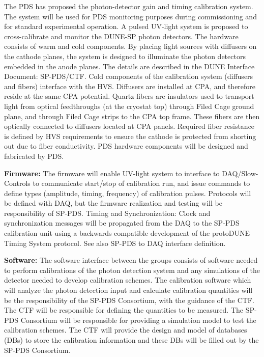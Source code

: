 The PDS has proposed the photon-detector gain and timing calibration system. The system will be used for PDS monitoring purposes during commissioning and for standard experimental operation. A pulsed UV-light system is proposed to cross-calibrate and monitor the DUNE-SP photon detectors. The hardware consists of warm and cold components. By placing light sources with diffusers on the cathode planes, the system is designed to illuminate the photon detectors embedded in the anode planes. The details are described in the DUNE Interface Document: SP-PDS/CTF. Cold components of the calibration system (diffusers and fibers) interface with the HVS. Diffusers are installed at CPA, and therefore reside at the same CPA potential. Quartz fibers are insulators used to transport light from optical feedthroughs (at the cryostat top) through Filed Cage ground plane, and through Filed Cage strips to the CPA top frame. These fibers are then optically connected to diffusers located at CPA panels. Required fiber resistance is defined by HVS requirements to ensure the cathode is protected from shorting out due to fiber conductivity. PDS hardware components will be designed and fabricated by PDS.

\textbf{Firmware:} The firmware will enable UV-light system to interface to DAQ/Slow-Controls to communicate start/stop of calibration run, and issue commands to define types (amplitude, timing, frequency) of calibration pulses. Protocols will be defined with DAQ, but the firmware realization and testing will be responsibility of SP-PDS. 
Timing and Synchronization: Clock and synchronization messages will be propagated from the DAQ to the SP-PDS calibration unit using a backwards compatible development of the protoDUNE Timing System protocol.
See also SP-PDS to DAQ interface definition.

\textbf{Software:} The software interface between the groups consists of software needed to perform calibrations of the photon detection system and any simulations of the detector needed to develop calibration schemes. The calibration software which will analyze the photon detection input and calculate calibration quantities will be the responsibility of the SP-PDS Consortium, with the guidance of the CTF. The CTF will be responsible for defining the quantities to be measured. The SP-PDS Consortium will be responsible for providing a simulation model to test the calibration schemes. The CTF will provide the design and model of databases (DBs) to store the calibration information and these DBs will be filled out by the SP-PDS Consortium.


